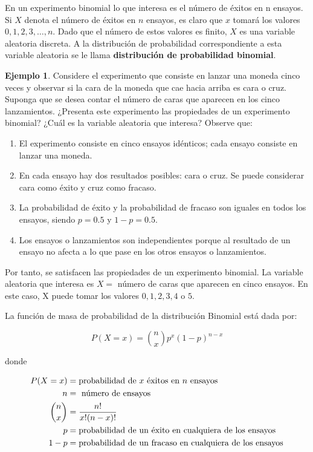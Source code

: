 \documentclass[
  11pt,
]{book}
\providecommand{\tightlist}{%
  \setlength{\itemsep}{0pt}\setlength{\parskip}{0pt}}
\theoremstyle{definition}
\theoremstyle{definition}
\newtheorem{example}{Ejemplo}[chapter]
\theoremstyle{definition}
\theoremstyle{definition}
\theoremstyle{remark}
\begin{document}
En un experimento binomial lo que interesa es el número de éxitos en n ensayos. Si \(X\) denota el número de éxitos en \(n\) ensayos, es claro que \(x\) tomará los valores \(0, 1, 2, 3, \ldots, n\). Dado que el número de estos valores es finito, \(X\) es una variable aleatoria discreta. A la distribución de probabilidad correspondiente a esta variable aleatoria se le llama \textbf{distribución de probabilidad binomial}.

\begin{example}
Considere el experimento que consiste en lanzar una moneda cinco veces y observar si la cara de la moneda que cae hacia arriba es cara o cruz. Suponga que se desea contar el número de caras que aparecen en los cinco lanzamientos. ¿Presenta este experimento las propiedades de un experimento binomial? ¿Cuál es la variable aleatoria que interesa? Observe que:

\begin{enumerate}
\def\labelenumi{\arabic{enumi}.}
\tightlist
\item
  El experimento consiste en cinco ensayos idénticos; cada ensayo consiste en lanzar una moneda.
\item
  En cada ensayo hay dos resultados posibles: cara o cruz. Se puede considerar cara como éxito y cruz como fracaso.
\item
  La probabilidad de éxito y la probabilidad de fracaso son iguales en todos los ensayos, siendo \(p = 0.5\) y \(1 - p = 0.5\).
\item
  Los ensayos o lanzamientos son independientes porque al resultado de un ensayo no afecta a lo que pase en los otros ensayos o lanzamientos.
\end{enumerate}

Por tanto, se satisfacen las propiedades de un experimento binomial. La variable aleatoria que interesa es \(X =\) número de caras que aparecen en cinco ensayos. En este caso, X puede tomar los valores \(0, 1, 2, 3, 4\) o \(5\).
\end{example}

La función de masa de probabilidad de la distribución Binomial está dada por:

\begin{equation}
P(X = x) = \binom{n}{x}p^x(1-p)^{n-x}
\label{eq:binomial}
\end{equation}

donde

\begin{equation}
\notag
\begin{split}
P(X = x) &= \text{probabilidad de } x \text{ éxitos en } n \text{ ensayos}\\
n &= \text{ número de ensayos}\\
\binom{n}{x} &= \dfrac{n!}{x!(n-x)!}\\
p &= \text{probabilidad de un éxito en cualquiera de los ensayos}\\
1 - p &= \text{probabilidad de un fracaso en cualquiera de los ensayos}\\
\end{split}
\end{equation}
\end{document}
